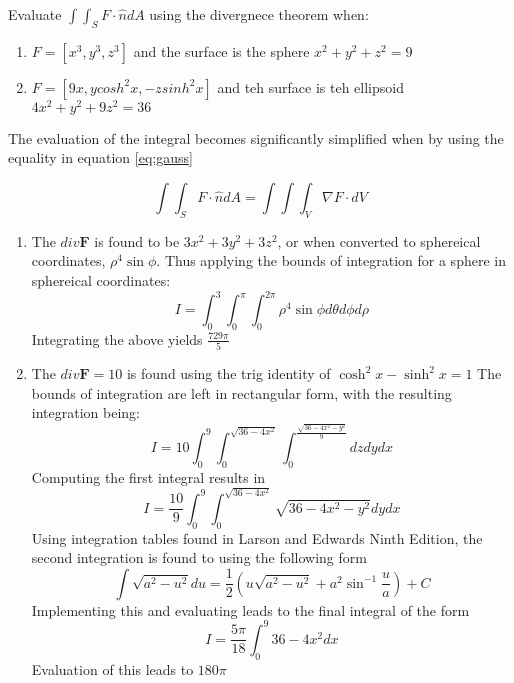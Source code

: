 Evaluate $\int \int_S F\cdot \hat{n} dA$ using the divergnece theorem when:
\begin{enumerate}
	\item $F=[x^3,y^3,z^3]$ and the surface is the sphere $x^2+y^2+z^2=9$
	\item $F=[9x,ycosh^2x,-zsinh^2x]$ and teh surface is teh ellipsoid $4x^2+y^2+9z^2=36$
\end{enumerate}
The evaluation of the integral becomes significantly simplified when by using the equality in equation \ref{eq:gauss}

\begin{equation}
	\int \int_S F\cdot \hat{n} dA=\int\int\int_V\nabla F\cdot dV
	\label{eq:gauss}
\end{equation}

\begin{enumerate}
	\item The $div \boldsymbol{F}$ is found to be $3x^2+3y^2+3z^2$, or when converted to sphereical coordinates, $\rho^4\sin \phi$. Thus applying the bounds of integration for a sphere in sphereical coordinates:
	\begin{equation*}
		I=\int_0^3\int_0^\pi\int_0^{2\pi} \rho^4\sin\phi d\theta d\phi d\rho
	\end{equation*}
	Integrating the above yields $\boxed{\frac{729\pi}{5}}$

	\item The $div \boldsymbol{F}=10$ is found using the trig identity of $\cosh^2x-\sinh^2x=1$ 
	The bounds of integration are left in rectangular form, with the resulting integration being:
	\begin{equation*}
		I=10\int_0^9\int_0^{\sqrt{36-4x^2}}\int_0^{\frac{\sqrt{36-4x^2-y^2}}{9}}dzdydx
	\end{equation*}
	Computing the first integral results in 
	\begin{equation*}
		I=\frac{10}{9}\int_0^9\int_0^{\sqrt{36-4x^2}} \sqrt{36-4x^2-y^2}dydx
	\end{equation*}
	Using integration tables found in Larson and Edwards Ninth Edition, the second integration is found to using the following form 
	\begin{equation}
		\int \sqrt{a^2-u^2}du=\frac{1}{2}\left(u\sqrt{a^2-u^2}+a^2 \sin^{-1}\frac{u}{a}\right)+C
	\end{equation}
	Implementing this and evaluating leads to the final integral of the form
		\begin{equation*}
		I=\frac{5\pi}{18}\int_0^9 36-4x^2 dx
	\end{equation*}
	Evaluation of this leads to $\boxed{180\pi}$

\end{enumerate} 
